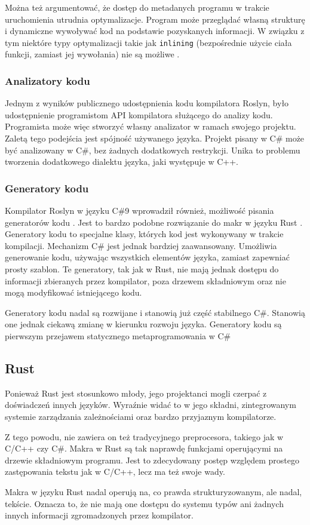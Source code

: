 Można też argumentować, że dostęp do metadanych programu w trakcie uruchomienia utrudnia optymalizacje.
Program może przeglądać własną strukturę i dynamiczne wywoływać kod na podstawie pozyskanych informacji.
W związku z tym niektóre typy optymalizacji takie jak \lstinline{inlining} (bezpośrednie użycie ciała funkcji, zamiast jej wywołania) nie są możliwe \cite{dotnet:method_inlining}.

\subsubsection{Analizatory kodu}

Jednym z wyników publicznego udostępnienia kodu kompilatora Roslyn\cite{roslyn}, było udostępnienie programistom API kompilatora służącego do analizy kodu.
Programista może więc stworzyć własny analizator w ramach swojego projektu.
Zaletą tego podejścia  jest spójność używanego języka.
Projekt pisany w C\# może być analizowany w C\#, bez żadnych dodatkowych restrykcji.
Unika to problemu tworzenia dodatkowego dialektu języka, jaki występuje w C++.

\subsubsection{Generatory kodu}

Kompilator Roslyn w języku C\#9 wprowadził również, możliwość pisania generatorów kodu \cite{csharp:source_generators,roslyn}.
Jest to bardzo podobne rozwiązanie do makr w języku Rust \cite{rust, klabnik2019rust}. Generatory kodu to specjalne klasy, których kod jest wykonywany w trakcie kompilacji. 
Mechanizm C\# jest jednak bardziej zaawansowany.
Umożliwia generowanie kodu, używając wszystkich elementów języka, zamiast zapewniać prosty szablon.
Te generatory, tak jak w Rust, nie mają jednak dostępu do informacji zbieranych przez kompilator, poza drzewem składniowym oraz nie mogą modyfikować istniejącego kodu.

Generatory kodu nadal są rozwijane i stanowią już część stabilnego C\#.
Stanowią one jednak ciekawą zmianę w kierunku rozwoju języka. 
Generatory kodu są pierwszym przejawem statycznego metaprogramowania w C\#

\subsection {Rust}
Ponieważ Rust \cite{rust, klabnik2019rust} jest stosunkowo młody, jego projektanci mogli czerpać z doświadczeń innych języków. Wyraźnie widać to w jego składni, zintegrowanym systemie zarządzania zależnościami oraz bardzo przyjaznym kompilatorze.\par
Z tego powodu, nie zawiera on też tradycyjnego preprocesora, takiego jak w C/C++ czy C\#. Makra w Rust są tak naprawdę funkcjami operującymi na drzewie składniowym programu. Jest to zdecydowany postęp względem prostego zastępowania tekstu jak w C/C++, lecz ma też swoje wady.\par
Makra w języku Rust nadal operują na, co prawda strukturyzowanym, ale nadal, tekście. Oznacza to, że nie mają one dostępu do systemu typów ani żadnych innych informacji zgromadzonych przez kompilator.\par
